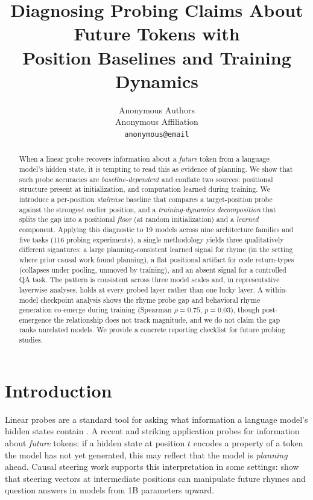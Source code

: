 \documentclass[11pt]{article}
\title{Diagnosing Probing Claims About Future Tokens with\\
Position Baselines and Training Dynamics}
\author{Anonymous Authors \\
  Anonymous Affiliation \\
  \texttt{anonymous@email} \\}
\begin{document}
\maketitle

\begin{abstract}
When a linear probe recovers information about a \emph{future} token from a
language model's hidden state, it is tempting to read this as evidence of
planning. We show that such probe accuracies are \emph{baseline-dependent} and
conflate two sources: positional structure present at initialization, and
computation learned during training. We introduce a per-position
\emph{staircase} baseline that compares a target-position probe against the
strongest earlier position, and a \emph{training-dynamics decomposition} that
splits the gap into a positional \emph{floor} (at random initialization) and a
\emph{learned} component. Applying this diagnostic to 19 models across nine
architecture families and five tasks (116 probing experiments), a single
methodology yields three qualitatively different signatures: a large
planning-consistent learned signal for rhyme (in the setting where prior causal
work found planning), a flat positional artifact for code return-types (collapses
under pooling, unmoved by training), and an absent signal for a controlled
QA task. The pattern is consistent across three model scales and, in
representative layerwise analyses, holds at every probed layer rather than
one lucky layer. A within-model checkpoint analysis shows the rhyme probe gap
and behavioral rhyme generation co-emerge during training (Spearman $\rho=0.75$,
$p=0.03$), though post-emergence the relationship does not track magnitude, and
we do not claim the gap ranks unrelated models. We provide a concrete reporting
checklist for future probing studies.
\end{abstract}

\section{Introduction}
\label{sec:intro}

Linear probes are a standard tool for asking what information a language
model's hidden states contain \citep{alain2017,belinkov2022,tenney2019}. A
recent and striking application probes for information about \emph{future}
tokens: if a hidden state at position $t$ encodes a property of a token the
model has not yet generated, this may reflect that the model is
\emph{planning} ahead. Causal steering work supports this interpretation in some
settings: \citet{maar2026} show that steering vectors at intermediate positions
can manipulate future rhymes and question answers in models from 1B parameters
upward.
\end{document}
